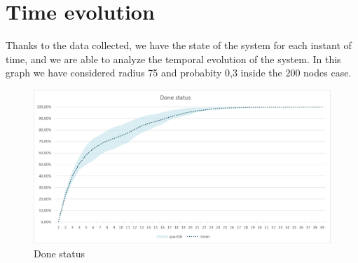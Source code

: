 \section{Time evolution}
Thanks to the data collected, we have the state of the system for each instant of time, and we are able to analyze the temporal evolution of the system. In this graph we have considered radius 75 and probabity 0,3 inside the 200 nodes case.
\begin{figure}[H]
\centering
    \includegraphics[width= 1\textwidth]{./images/DoneStatus_200N-30p75r.png}
    \caption{Done status}
    \label{fig:immagine}
\end{figure}